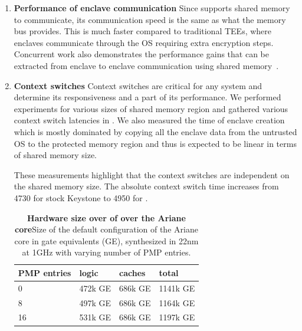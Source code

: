 \begin{enumerate}
\item \textbf{Performance of enclave communication}
Since \name{} supports shared memory to communicate, its communication speed is the same as what the memory bus provides. This is much faster compared to traditional TEEs, where enclaves communicate through the OS requiring extra encryption steps. Concurrent work also demonstrates the performance gains that can be extracted from enclave to enclave communication using shared memory~\cite{yu2020elasticlave}.


\item \textbf{Context switches}
Context switches are critical for any system and determine its responsiveness and a part of its performance.
We performed experiments for various sizes of shared memory region and gathered various context switch latencies in . We also measured the time of enclave creation which is mostly dominated by copying all the enclave data from the untrusted OS to the protected memory region and thus is expected to be linear in terms of shared memory size. 

These measurements highlight that the context switches are independent on the shared memory size. The absolute context switch time increases from 4730 for stock Keystone to 4950 for \name{}.

\begin{table}[tbp]
    \centering
    \caption[Hardware size over of \name over the Ariane core]{\textbf{Hardware size over of \name over the Ariane core}Size of the default configuration of the Ariane core in gate equivalents (GE), synthesized in 22nm at 1GHz with varying number of PMP entries.}
    \begin{tabular}{llll}\toprule
        PMP entries & logic & caches & total \\\midrule
        0 & 472k GE & 686k GE & 1141k GE \\
        8 & 497k GE & 686k GE & 1164k GE \\
        16 & 531k GE & 686k GE & 1197k GE \\ \bottomrule
    \end{tabular}
    

\end{table}
\end{enumerate}

